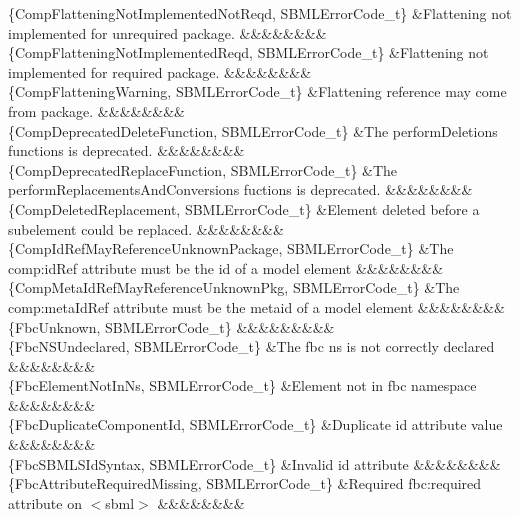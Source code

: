 \begin{DoxyParagraph}{}
\begin{longtabu}
\{Comp\+Flattening\+Not\+Implemented\+Not\+Reqd, S\+B\+M\+L\+Error\+Code\+\_\+t\} &Flattening not implemented for unrequired package. &&&&&&&&\\
\{Comp\+Flattening\+Not\+Implemented\+Reqd, S\+B\+M\+L\+Error\+Code\+\_\+t\} &Flattening not implemented for required package. &&&&&&&&\\
\{Comp\+Flattening\+Warning, S\+B\+M\+L\+Error\+Code\+\_\+t\} &Flattening reference may come from package. &&&&&&&&\\
\{Comp\+Deprecated\+Delete\+Function, S\+B\+M\+L\+Error\+Code\+\_\+t\} &The perform\+Deletions functions is deprecated. &&&&&&&&\\
\{Comp\+Deprecated\+Replace\+Function, S\+B\+M\+L\+Error\+Code\+\_\+t\} &The perform\+Replacements\+And\+Conversions fuctions is deprecated. &&&&&&&&\\
\{Comp\+Deleted\+Replacement, S\+B\+M\+L\+Error\+Code\+\_\+t\} &Element deleted before a subelement could be replaced. &&&&&&&&\\
\{Comp\+Id\+Ref\+May\+Reference\+Unknown\+Package, S\+B\+M\+L\+Error\+Code\+\_\+t\} &The \textquotesingle{}comp\+:id\+Ref\textquotesingle{} attribute must be the \textquotesingle{}id\textquotesingle{} of a model element &&&&&&&&\\
\{Comp\+Meta\+Id\+Ref\+May\+Reference\+Unknown\+Pkg, S\+B\+M\+L\+Error\+Code\+\_\+t\} &The \textquotesingle{}comp\+:meta\+Id\+Ref\textquotesingle{} attribute must be the \textquotesingle{}metaid\textquotesingle{} of a model element &&&&&&&&\\
\{Fbc\+Unknown, S\+B\+M\+L\+Error\+Code\+\_\+t\} &&&&&&&&&\\
\{Fbc\+N\+S\+Undeclared, S\+B\+M\+L\+Error\+Code\+\_\+t\} &The fbc ns is not correctly declared &&&&&&&&\\
\{Fbc\+Element\+Not\+In\+Ns, S\+B\+M\+L\+Error\+Code\+\_\+t\} &Element not in fbc namespace &&&&&&&&\\
\{Fbc\+Duplicate\+Component\+Id, S\+B\+M\+L\+Error\+Code\+\_\+t\} &Duplicate \textquotesingle{}id\textquotesingle{} attribute value &&&&&&&&\\
\{Fbc\+S\+B\+M\+L\+S\+Id\+Syntax, S\+B\+M\+L\+Error\+Code\+\_\+t\} &Invalid \textquotesingle{}id\textquotesingle{} attribute &&&&&&&&\\
\{Fbc\+Attribute\+Required\+Missing, S\+B\+M\+L\+Error\+Code\+\_\+t\} &Required fbc\+:required attribute on {\ttfamily $<$sbml$>$} &&&&&&&&\\

\end{longtabu}
\end{DoxyParagraph}
